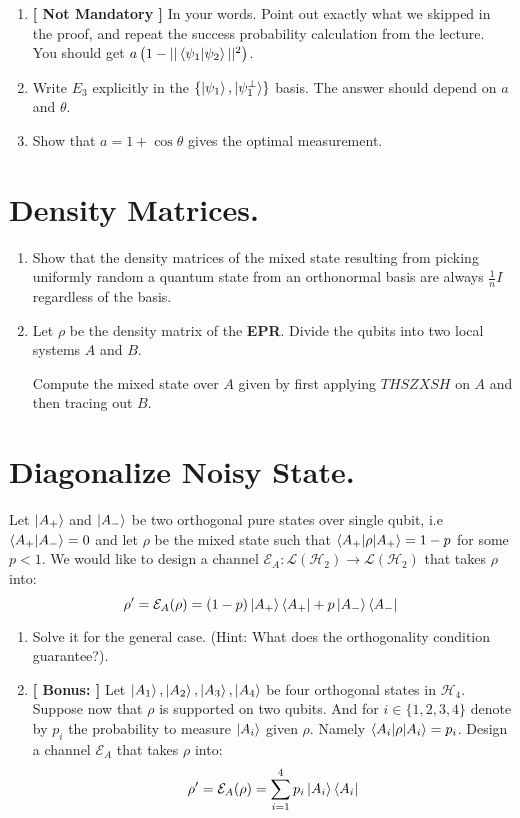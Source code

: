 \begin{enumerate}
    \item \textbf{[ Not Mandatory ] } In your words. Point out exactly what we skipped in the proof, and repeat the success probability calculation from the lecture. You should get $ a\left( 1  -||\braket{\psi_{1}| \psi_{2}}||^2 \right)$. 
    \item Write $E_{3}$ explicitly in the $\{\ket{\psi_{1}}, \ket{\psi_{1}^\perp}\}$ basis. The answer should depend on $a$ and $\theta$.
 \item Show that $a = 1 + \cos \theta $ gives the optimal measurement.  
\end{enumerate}

\section{Density Matrices.}
\begin{enumerate}
\item Show that the density matrices of the mixed state resulting from picking uniformly random a quantum state from an orthonormal basis are always $\frac{1}{n}I$ regardless of the basis.  

\item Let $\rho$ be the density matrix of the \textbf{EPR}. Divide the qubits into two local systems $A$ and $B$.
    
    Compute the mixed state over $A$ given by first applying $T H S Z XSH$ on $A$ and then tracing out $B$.    
 
\end{enumerate}

\newcommand{\channel}{\mathcal{L}\left( \mathcal{H}_{2} \right)  \rightarrow \mathcal{L}\left( \mathcal{H}_{2} \right)} 

\newpage

\section{Diagonalize Noisy State.}
Let $\ket{A_{+}}$ and $\ket{A_{-}}$ be two orthogonal pure states over single qubit, i.e $\braket{A_{+} | A_{-}} = 0$ and let $\rho$ be the mixed state such that $\braket{A_{+}|\rho|A_{+}}  = 1 -p$ for some $p<1$. We would like to design a channel $\mathcal{E}_{A}: \channel $ that takes $\rho$ into:
    $$\rho^\prime = \mathcal{E}_{A}(\rho) = (1-p)\ket{A_{+}}\bra{A_{+}} + p\ket{A_{-}}\bra{A_{-}}$$ 
\begin{enumerate} 
    \item Solve it for the general case. (Hint: What does the orthogonality condition guarantee?). 
    \item \textbf{[ Bonus: ]} Let $\ket{A_1},\ket{A_2},\ket{A_3}, \ket{A_{4}}$ be four orthogonal states in $\mathcal{H}_{4}$. Suppose now that $\rho$ is supported on two qubits.  And for $i \in \{1,2,3,4\}$ denote by $p_{i}$ the probability to measure $\ket{A_i}$ given $\rho$. Namely $ \braket{A_i|\rho|A_i} = p_i$. Design a channel $\mathcal{E}_{A}$ that takes $\rho$ into:
    $$\rho^\prime = \mathcal{E}_{A}(\rho) =  \sum_{i=1}^{4}{p_{i}\ket{A_{i}}\bra{A_{i}}} $$  
\end{enumerate}

